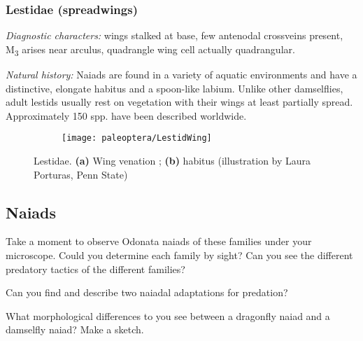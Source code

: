 \subsubsection{Lestidae (spreadwings)}
\noindent{}\textit{Diagnostic characters:} wings stalked at base, few antenodal crossveins present, \texorpdfstring{M\textsubscript{3}}{ }{ } arises near arculus, quadrangle wing cell actually quadrangular.\vspace{3mm}

\noindent{}\textit{Natural history:} Naiads are found in a variety of aquatic environments and have a distinctive, elongate habitus and a spoon-like labium. Unlike other damselflies, adult lestids usually rest on vegetation with their wings at least partially spread. Approximately 150 spp. have been described worldwide.\vspace{3mm} 

\begin{figure}[ht!]
    \centering
    \begin{subfigure}[ht!]{0.45\textwidth}
        \texttt{[image: paleoptera/LestidWing]}
        \caption{}
        \label{fig:lestwing}
    \end{subfigure}
    \hfill
    \begin{subfigure}[ht!]{0.45\textwidth}
        \caption{}
        \label{fig:lestbody}
    \end{subfigure}
    \caption{Lestidae. \textbf{(a)} Wing venation \citep[][Fig. 232]{comstock1918wings}; \textbf{(b)} habitus (illustration by Laura Porturas, Penn State)}\label{fig:lestid}
\end{figure}%

\subsection{Naiads}
Take a moment to observe Odonata naiads of these families under your microscope. Could you determine each family by sight? Can you see the different predatory tactics of the different families?\vspace{3mm}

\begin{theo}
{}Can you find and describe two naiadal adaptations for predation?\vspace{3mm}

\noindent{}What morphological differences to you see between a dragonfly naiad and a damselfly naiad? Make a sketch.
\end{theo}

